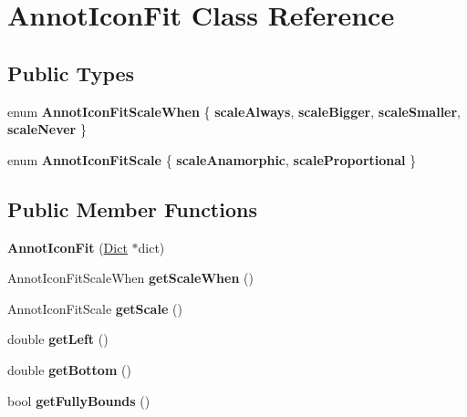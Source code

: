 \hypertarget{class_annot_icon_fit}{}\section{Annot\+Icon\+Fit Class Reference}
\label{class_annot_icon_fit}
\subsection*{Public Types}
\begin{DoxyCompactItemize}
\item 
\mbox{\label{class_annot_icon_fit_ab171e02075648db07f4af6301cc0c2e8}} 
enum {\bfseries Annot\+Icon\+Fit\+Scale\+When} \{ {\bfseries scale\+Always}, 
{\bfseries scale\+Bigger}, 
{\bfseries scale\+Smaller}, 
{\bfseries scale\+Never}
 \}
\item 
\mbox{\label{class_annot_icon_fit_a0b309715ded33a4b5b4d77cbf341ece1}} 
enum {\bfseries Annot\+Icon\+Fit\+Scale} \{ {\bfseries scale\+Anamorphic}, 
{\bfseries scale\+Proportional}
 \}
\end{DoxyCompactItemize}
\subsection*{Public Member Functions}
\begin{DoxyCompactItemize}
\item 
\mbox{\label{class_annot_icon_fit_a913f6b41bd706702af3b76d9e7b771ac}} 
{\bfseries Annot\+Icon\+Fit} (\hyperlink{class_dict}{Dict} $\ast$dict)
\item 
\mbox{\label{class_annot_icon_fit_a17e5b6647fc826bb17e7e9780f181b56}} 
Annot\+Icon\+Fit\+Scale\+When {\bfseries get\+Scale\+When} ()
\item 
\mbox{\label{class_annot_icon_fit_a1aa9eba4d8cf1c026fc186c6027c0ecb}} 
Annot\+Icon\+Fit\+Scale {\bfseries get\+Scale} ()
\item 
\mbox{\label{class_annot_icon_fit_ab601a389ce2ddb97cd9098a43ebee12b}} 
double {\bfseries get\+Left} ()
\item 
\mbox{\label{class_annot_icon_fit_adf43263ce631ec35f0da60155161d2ec}} 
double {\bfseries get\+Bottom} ()
\item 
\mbox{\label{class_annot_icon_fit_ade28ce3947c2d5869b6908a72e51309c}} 
bool {\bfseries get\+Fully\+Bounds} ()
\end{DoxyCompactItemize}
